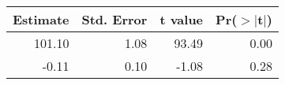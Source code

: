 \begin{table}[ht]
\centering
\begin{tabular}{rrrr}
  \hline
Estimate & Std. Error & t value & Pr($>$$|$t$|$) \\ 
  \hline
101.10 & 1.08 & 93.49 & 0.00 \\ 
  -0.11 & 0.10 & -1.08 & 0.28 \\ 
   \hline
\end{tabular}
\end{table}
